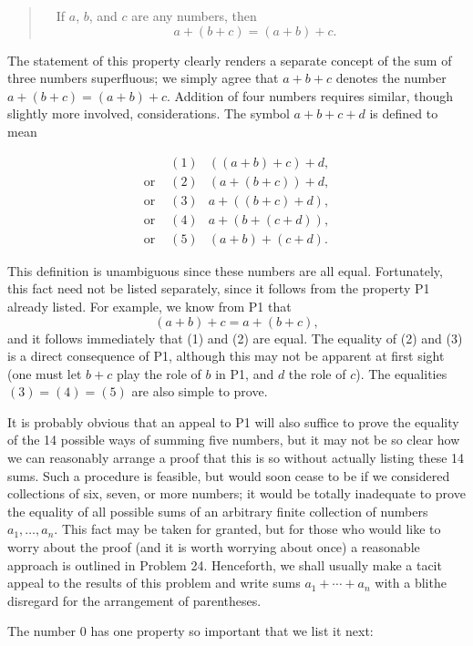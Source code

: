 \begin{quote}
\ \ If $a$, $b$, and $c$ are any numbers, then
\[ a + (b + c) = (a + b) + c. \]
\end{quote}

The statement of this property clearly renders a separate concept of the sum
of three numbers superfluous; we simply agree that $a+b+c$ denotes the number
$a+(b+c)=(a+b)+c$. Addition of four numbers requires similar, though slightly
more involved, considerations. The symbol $a+b+c+d$ is defined to mean

\begin{align*}
&(1) & ((a+b)+c)+d,\\
\text{or } &(2) & (a+(b+c))+d,\\
\text{or } &(3) & a+((b+c)+d),\\
\text{or } &(4) & a+(b+(c+d)),\\
\text{or } &(5) & (a+b)+(c+d).
\end{align*}

This definition is unambiguous since these numbers are all equal.
Fortunately, this fact need not be listed separately, since it follows from
the property P1 already listed. For example, we know from P1 that
\[ (a+b)+c = a+(b+c), \]
and it follows immediately that (1) and (2) are equal. The equality of (2)
and (3) is a direct consequence of P1, although this may not be apparent at
first sight (one must let $b+c$ play the role of $b$ in P1, and $d$ the role
of $c$). The equalities $(3)=(4)=(5)$ are also simple to prove.

It is probably obvious that an appeal to P1 will also suffice to prove the
equality of the 14 possible ways of summing five numbers, but it may not be so
clear how we can reasonably arrange a proof that this is so without actually
listing these 14 sums. Such a procedure is feasible, but would soon cease to
be if we considered collections of six, seven, or more numbers; it would be
totally inadequate to prove the equality of all possible sums of an arbitrary
finite collection of numbers $a_1, \dots, a_n$. This fact may be taken for
granted, but for those who would like to worry about the proof (and it is
worth worrying about once) a reasonable approach is outlined in Problem 24.
Henceforth, we shall usually make a tacit appeal to the results of this
problem and write sums $a_1 + \cdots + a_n$ with a blithe disregard for the
arrangement of parentheses.

The number $0$ has one property so important that we list it next:

